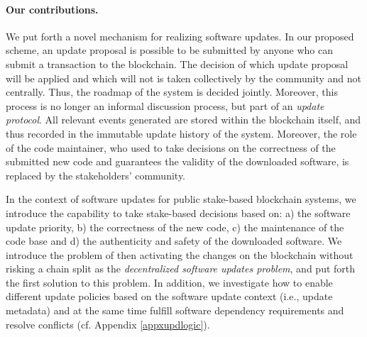 \paragraph{Our contributions.}
We put forth a novel mechanism for realizing software updates. In our proposed scheme, an update proposal is possible to be submitted by anyone who can submit a transaction to the blockchain. The decision of which update proposal will be applied and which will not is taken collectively by the community and not centrally. Thus, the roadmap of the system is decided jointly. Moreover, this process is no longer an informal discussion process, but part of an \emph{update protocol}. All relevant events generated are stored within the blockchain itself, and thus recorded in the immutable update history of the system. Moreover, the role of the code maintainer, who used to take decisions on the correctness of the submitted new code and guarantees the validity of the downloaded software, is replaced by the stakeholders' community.

In the context of software updates for public stake-based blockchain systems, we introduce the capability to take stake-based decisions
 based on: a) the software update priority, b) the correctness of the new code, c) the maintenance of the code base and d) the authenticity and safety of the downloaded software. We introduce the problem of then activating the changes on the blockchain without risking a chain split
 as the \emph{decentralized software updates problem}, and put forth the first solution to this problem. In addition, we investigate how to enable different update policies based on the software update context (i.e., update metadata) and at the same time fulfill software dependency requirements and resolve conflicts (cf. Appendix \ref{appxupdlogic}).

